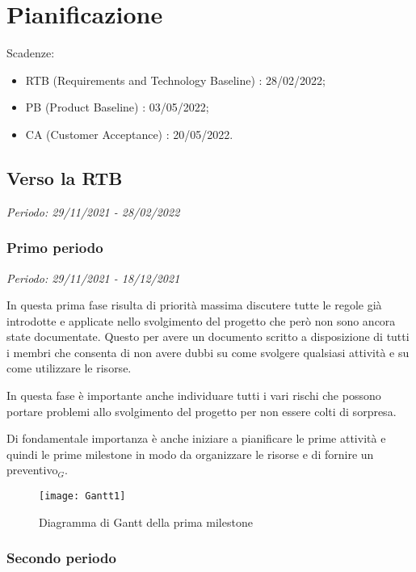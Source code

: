 \chapter{Pianificazione}

Scadenze:
\begin{itemize}
    \item RTB (Requirements and Technology Baseline) : 28/02/2022;
    \item PB (Product Baseline) : 03/05/2022;
    \item CA (Customer Acceptance) : 20/05/2022.
\end{itemize}

\section{Verso la RTB}

\textit{Periodo: 29/11/2021 - 28/02/2022}

\subsection{Primo periodo}

\textit{Periodo: 29/11/2021 - 18/12/2021}

In questa prima fase risulta di priorità massima discutere tutte le regole già introdotte
e applicate nello svolgimento del progetto che però non sono ancora state documentate.
Questo per avere un documento scritto a disposizione di tutti i membri che consenta di
non avere dubbi su come svolgere qualsiasi attività e su come utilizzare le risorse.
\par In questa fase è importante anche individuare tutti i vari rischi che possono portare
problemi allo svolgimento del progetto per non essere colti di sorpresa.
\par Di fondamentale importanza è anche iniziare a pianificare le prime attività e quindi
le prime milestone in modo da organizzare le risorse e di fornire un preventivo$_G$.

\begin{figure}[!ht]
    \texttt{[image: Gantt1]}
    \caption{Diagramma di Gantt della prima milestone}
\end{figure}

\newpage

\subsection{Secondo periodo}

